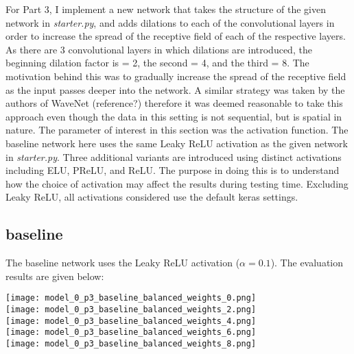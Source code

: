 \documentclass{article}
\begin{document}
For Part 3, I implement a new network that takes the structure of the given network in \emph{starter.py}, and adds dilations to each of the convolutional layers in order to increase the spread of the receptive field of each of the respective layers. As there are 3 convolutional layers in which dilations are introduced, the beginning dilation factor is = 2, the second = 4, and the third = 8. The motivation behind this was to gradually increase the spread of the receptive field as the input passes deeper into the network. A similar strategy was taken by the authors of WaveNet (reference?) therefore it was deemed reasonable to take this approach even though the data in this setting is not sequential, but is spatial in nature. The parameter of interest in this section was the activation function. The baseline network here uses the same Leaky ReLU activation as the given network in \emph{starter.py}. Three additional variants are introduced using distinct activations including ELU, PReLU, and ReLU. The purpose in doing this is to understand how the choice of activation may affect the results during testing time. Excluding Leaky ReLU, all activations considered use the default keras settings.

\subsection*{baseline}
The baseline network uses the Leaky ReLU activation ($\alpha = 0.1$). The evaluation results are given below:
		
		
		
\texttt{[image: model\_0\_p3\_baseline\_balanced\_weights\_0.png]} \\
\texttt{[image: model\_0\_p3\_baseline\_balanced\_weights\_2.png]} \\
\texttt{[image: model\_0\_p3\_baseline\_balanced\_weights\_4.png]} \\
\texttt{[image: model\_0\_p3\_baseline\_balanced\_weights\_6.png]} \\
\texttt{[image: model\_0\_p3\_baseline\_balanced\_weights\_8.png]} \\


		
\end{document}
